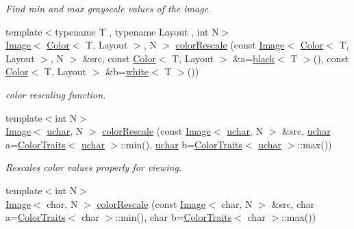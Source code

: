 \begin{DoxyCompactItemize}
\begin{DoxyCompactList}\small\item\em Find min and max grayscale values of the image. \end{DoxyCompactList}\item 
\hypertarget{group___image_gae3e29da826156e86b948cc0fda4d6e4d}{{\footnotesize template$<$typename T , typename Layout , int N$>$ }\\\hyperlink{class_d_o_1_1_image}{Image}$<$ \hyperlink{class_d_o_1_1_color}{Color}$<$ T, Layout $>$, N $>$ \hyperlink{group___image_gae3e29da826156e86b948cc0fda4d6e4d}{color\-Rescale} (const \hyperlink{class_d_o_1_1_image}{Image}$<$ \hyperlink{class_d_o_1_1_color}{Color}$<$ T, Layout $>$, N $>$ \&src, const \hyperlink{class_d_o_1_1_color}{Color}$<$ T, Layout $>$ \&a=\hyperlink{group___channel_accessors_ga18f2660186c9e25f69ed6fe2d474752c}{black}$<$ T $>$(), const \hyperlink{class_d_o_1_1_color}{Color}$<$ T, Layout $>$ \&b=\hyperlink{group___primary_colors_gadc4ed12abc0d5a541d12226cb1b4aff3}{white}$<$ T $>$())}\label{group___image_gae3e29da826156e86b948cc0fda4d6e4d}

\begin{DoxyCompactList}\small\item\em color rescaling function. \end{DoxyCompactList}\item 
\hypertarget{group___image_gaac38b26a9b94db93dfd55b8842eab9ce}{{\footnotesize template$<$int N$>$ }\\\hyperlink{class_d_o_1_1_image}{Image}$<$ \hyperlink{group___eigen_typedefs_ga65f85814a8290f9797005d3b28e7e5fc}{uchar}, N $>$ \hyperlink{group___image_gaac38b26a9b94db93dfd55b8842eab9ce}{color\-Rescale} (const \hyperlink{class_d_o_1_1_image}{Image}$<$ \hyperlink{group___eigen_typedefs_ga65f85814a8290f9797005d3b28e7e5fc}{uchar}, N $>$ \&src, \hyperlink{group___eigen_typedefs_ga65f85814a8290f9797005d3b28e7e5fc}{uchar} a=\hyperlink{struct_d_o_1_1_color_traits}{Color\-Traits}$<$ \hyperlink{group___eigen_typedefs_ga65f85814a8290f9797005d3b28e7e5fc}{uchar} $>$\-::min(), \hyperlink{group___eigen_typedefs_ga65f85814a8290f9797005d3b28e7e5fc}{uchar} b=\hyperlink{struct_d_o_1_1_color_traits}{Color\-Traits}$<$ \hyperlink{group___eigen_typedefs_ga65f85814a8290f9797005d3b28e7e5fc}{uchar} $>$\-::max())}\label{group___image_gaac38b26a9b94db93dfd55b8842eab9ce}

\begin{DoxyCompactList}\small\item\em Rescales color values properly for viewing. \end{DoxyCompactList}\item 
\hypertarget{group___image_gade813affccdcbf8455a9ff56245a33f7}{{\footnotesize template$<$int N$>$ }\\\hyperlink{class_d_o_1_1_image}{Image}$<$ char, N $>$ \hyperlink{group___image_gade813affccdcbf8455a9ff56245a33f7}{color\-Rescale} (const \hyperlink{class_d_o_1_1_image}{Image}$<$ char, N $>$ \&src, char a=\hyperlink{struct_d_o_1_1_color_traits}{Color\-Traits}$<$ char $>$\-::min(), char b=\hyperlink{struct_d_o_1_1_color_traits}{Color\-Traits}$<$ char $>$\-::max())}\label{group___image_gade813affccdcbf8455a9ff56245a33f7}


\end{DoxyCompactItemize}
